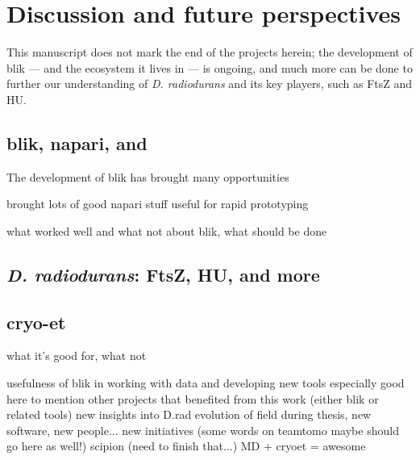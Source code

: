 \chapter{Discussion and future perspectives}\label{future}

This manuscript does not mark the end of the projects herein; the development of blik --- and the ecosystem it lives in --- is ongoing, and much more can be done to further our understanding of \textit{D. radiodurans} and its key players, such as FtsZ and HU.

\localtableofcontents

\section{blik, napari, and }

The development of blik has brought many opportunities

brought lots of good napari stuff
useful for rapid prototyping

what worked well and what not about blik, what should be done

\section{\textit{D. radiodurans}: FtsZ, HU, and more}


\section{cryo-et}

what it's good for, what not

\begin{outline}
\1 usefulness of blik in working with data and developing new tools
    \2 especially good here to mention other projects that benefited from this work (either blik or related tools)
\1 new insights into D.rad
\1 evolution of field during thesis, new software, new people... new initiatives (some words on teamtomo maybe should go here as well!)
\1 scipion (need to finish that...)
\1 MD + cryoet = awesome
\end{outline}
